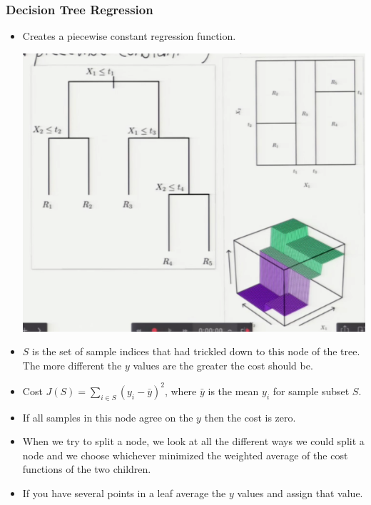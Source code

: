 \documentclass[10pt]{article}
\begin{document}
\subsubsection*{Decision Tree Regression}
	\begin{itemize}
		\item Creates a piecewise constant regression function.
		\begin{center}
			\includegraphics[scale=0.4]{../images/decisionregression}
		\end{center}
		\item $S$ is the set of sample indices that had trickled down to this node of the tree. The more different the $y$ values are the greater the cost should be.
		\item Cost $J(S) = \sum_{i \in S} (y_{i} - \bar{y})^{2}$, where $\bar{y}$ is the mean $y_{i}$ for sample subset $S$.
		\item If all samples in this node agree on the $y$ then the cost is zero.
		\item When we try to split a node, we look at all the different ways we could split a node and we choose whichever minimized the weighted average of the cost functions of the two children.
		\item If you have several points in a leaf average the $y$ values and assign that value.
	\end{itemize}
\end{document}
